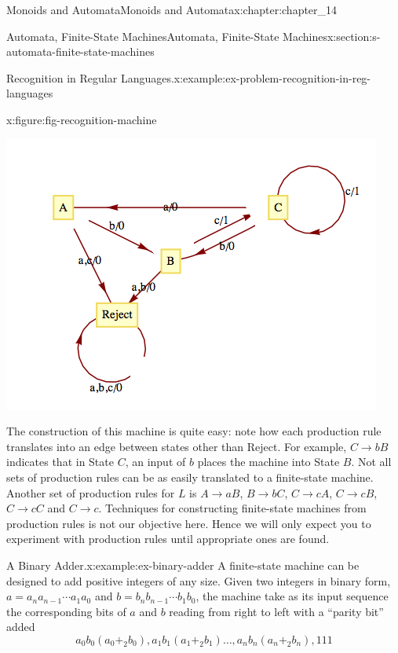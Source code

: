 \documentclass[twoside,10pt,]{book}
\numberwithin{equation}{section}
\begin{document}
\begin{chapterptx}{Monoids and Automata}{}{Monoids and Automata}{}{}{x:chapter:chapter_14}
\begin{sectionptx}{Automata, Finite-State Machines}{}{Automata, Finite-State Machines}{}{}{x:section:s-automata-finite-state-machines}
\begin{example}{Recognition in Regular Languages.}{x:example:ex-problem-recognition-in-reg-languages}
\begin{figureptx}{}{x:figure:fig-recognition-machine}{}
\begin{image}{0.15}{0.7}{0.15}
\includegraphics[width=\linewidth]{images/fig-recognition-machine.png}
\end{image}%
\tcblower
\end{figureptx}%
The construction of this machine is quite easy: note how each production rule translates into an edge between states other than Reject. For example, \(C\to bB\) indicates that in State \(C\), an input of \(b\) places the machine into State \(B\). Not all sets of production rules can be as easily translated to a finite-state machine. Another set of production rules for \(L\) is \(A\to aB\), \(B\to bC\), \(C\to cA\), \(C\to cB\), \(C\to cC\) and \(C\to c\). Techniques for constructing finite-state machines from production rules is not our objective here. Hence we will only expect you to experiment with production rules until appropriate ones are found.%
\end{example}
\begin{example}{A Binary Adder.}{x:example:ex-binary-adder}%
A finite-state machine can be designed to add positive integers of any size. Given two integers in binary form, \(a=a_na_{n-1} \cdots  a_1a_0\) and \(b=b_n b_{n-1}\cdots  b_1b_0\), the machine take as its input sequence the corresponding bits of \(a\) and \(b\) reading from right to left with a ``parity bit'' added%
\begin{equation*}
a_0b_0\left(a_0+_2b_0\right) ,a_1b_1\left(a_1+_2b_1\right) \ldots  , a_nb_n\left(a_n+_2b_n\right),111
\end{equation*}
%
\par

\end{example}
\end{sectionptx}
\end{chapterptx}
\end{document}
